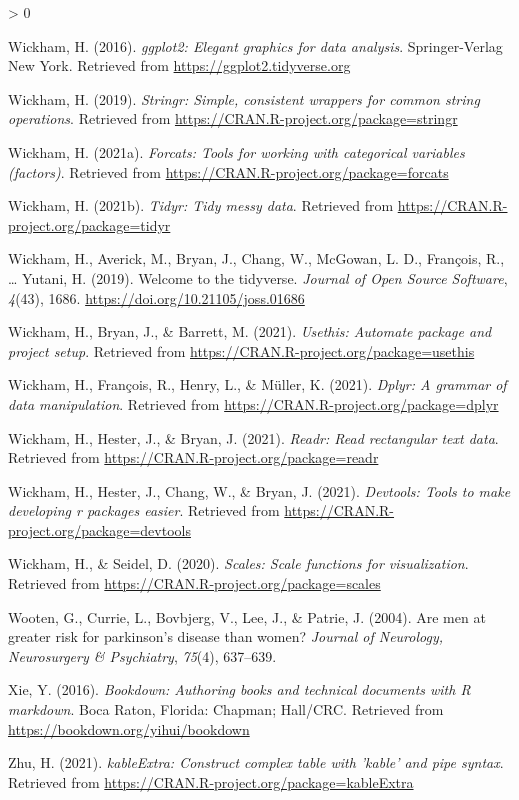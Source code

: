 \documentclass[
  english,
  doc,floatsintext]{apa6}
\newlength{\cslhangindent}
\newenvironment{CSLReferences}[2] %
 {%
  \setlength{\parindent}{0pt}
  \ifodd #1 \everypar{\setlength{\hangindent}{\cslhangindent}}\ignorespaces\fi
  \ifnum #2 > 0
  \setlength{\parskip}{#2\baselineskip}
  \fi
 }%
 {}
\begin{document}
\begin{CSLReferences}{1}{0}
\leavevmode\hypertarget{ref-R-ggplot2}{}%
Wickham, H. (2016). \emph{ggplot2: Elegant graphics for data analysis}. Springer-Verlag New York. Retrieved from \url{https://ggplot2.tidyverse.org}

\leavevmode\hypertarget{ref-R-stringr}{}%
Wickham, H. (2019). \emph{Stringr: Simple, consistent wrappers for common string operations}. Retrieved from \url{https://CRAN.R-project.org/package=stringr}

\leavevmode\hypertarget{ref-R-forcats}{}%
Wickham, H. (2021a). \emph{Forcats: Tools for working with categorical variables (factors)}. Retrieved from \url{https://CRAN.R-project.org/package=forcats}

\leavevmode\hypertarget{ref-R-tidyr}{}%
Wickham, H. (2021b). \emph{Tidyr: Tidy messy data}. Retrieved from \url{https://CRAN.R-project.org/package=tidyr}

\leavevmode\hypertarget{ref-R-tidyverse}{}%
Wickham, H., Averick, M., Bryan, J., Chang, W., McGowan, L. D., François, R., \ldots{} Yutani, H. (2019). Welcome to the {tidyverse}. \emph{Journal of Open Source Software}, \emph{4}(43), 1686. \url{https://doi.org/10.21105/joss.01686}

\leavevmode\hypertarget{ref-R-usethis}{}%
Wickham, H., Bryan, J., \& Barrett, M. (2021). \emph{Usethis: Automate package and project setup}. Retrieved from \url{https://CRAN.R-project.org/package=usethis}

\leavevmode\hypertarget{ref-R-dplyr}{}%
Wickham, H., François, R., Henry, L., \& Müller, K. (2021). \emph{Dplyr: A grammar of data manipulation}. Retrieved from \url{https://CRAN.R-project.org/package=dplyr}

\leavevmode\hypertarget{ref-R-readr}{}%
Wickham, H., Hester, J., \& Bryan, J. (2021). \emph{Readr: Read rectangular text data}. Retrieved from \url{https://CRAN.R-project.org/package=readr}

\leavevmode\hypertarget{ref-R-devtools}{}%
Wickham, H., Hester, J., Chang, W., \& Bryan, J. (2021). \emph{Devtools: Tools to make developing r packages easier}. Retrieved from \url{https://CRAN.R-project.org/package=devtools}

\leavevmode\hypertarget{ref-R-scales}{}%
Wickham, H., \& Seidel, D. (2020). \emph{Scales: Scale functions for visualization}. Retrieved from \url{https://CRAN.R-project.org/package=scales}

\leavevmode\hypertarget{ref-wooten2004men}{}%
Wooten, G., Currie, L., Bovbjerg, V., Lee, J., \& Patrie, J. (2004). Are men at greater risk for parkinson's disease than women? \emph{Journal of Neurology, Neurosurgery \& Psychiatry}, \emph{75}(4), 637--639.

\leavevmode\hypertarget{ref-R-bookdown}{}%
Xie, Y. (2016). \emph{Bookdown: Authoring books and technical documents with {R} markdown}. Boca Raton, Florida: Chapman; Hall/CRC. Retrieved from \url{https://bookdown.org/yihui/bookdown}

\leavevmode\hypertarget{ref-R-kableExtra}{}%
Zhu, H. (2021). \emph{kableExtra: Construct complex table with 'kable' and pipe syntax}. Retrieved from \url{https://CRAN.R-project.org/package=kableExtra}

\end{CSLReferences}
\end{document}
